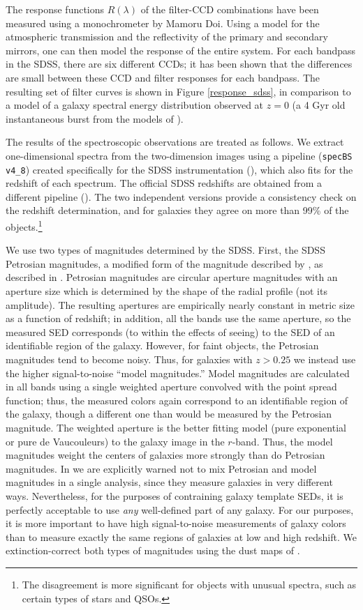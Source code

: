 \documentclass[10pt,preprint]{aastex}
\begin{document}
The response functions $R(\lambda)$ of the filter-CCD combinations
have been measured using a monochrometer by Mamoru Doi.  Using a model
for the atmospheric transmission and the reflectivity of the primary
and secondary mirrors, one can then model the response of the entire
system. For each bandpass in the SDSS, there are six different CCDs;
it has been shown that the differences are small between these CCD and
filter responses for each bandpass.  The resulting set of filter
curves is shown in Figure \ref{response_sdss}, in comparison to a
model of a galaxy spectral energy distribution observed at $z=0$ (a 4
Gyr old instantaneous burst from the models of \citealt{bruzual93a}).

The results of the spectroscopic observations are treated as follows.
We extract one-dimensional spectra from the two-dimension images using
a pipeline ({\tt specBS v4\_8}) created specifically for the SDSS
instrumentation (\citealt{schlegel02a}), which also fits for the
redshift of each spectrum. The official SDSS redshifts are obtained
from a different pipeline (\citealt{subbarao02a}). The two independent
versions provide a consistency check on the redshift determination,
and for galaxies they agree on more than 99\% of the
objects.\footnote{The disagreement is more significant for objects
with unusual spectra, such as certain types of stars and QSOs.}

We use two types of magnitudes determined by the SDSS. First, the SDSS
Petrosian magnitudes, a modified form of the magnitude described by
\citet{petrosian76a}, as described in \citet{strauss02a}.  Petrosian
magnitudes are circular aperture magnitudes with an aperture size
which is determined by the shape of the radial profile (not its
amplitude). The resulting apertures are empirically nearly constant in
metric size as a function of redshift; in addition, all the bands use
the same aperture, so the measured SED corresponds (to within the
effects of seeing) to the SED of an identifiable region of the
galaxy. However, for faint objects, the Petrosian magnitudes tend to
become noisy. Thus, for galaxies with $z>0.25$ we instead use the
higher signal-to-noise ``model magnitudes.'' Model magnitudes are
calculated in all bands using a single weighted aperture convolved
with the point spread function; thus, the measured colors again
correspond to an identifiable region of the galaxy, though a different
one than would be measured by the Petrosian magnitude. The weighted
aperture is the better fitting model (pure exponential or pure de
Vaucouleurs) to the galaxy image in the $r$-band. Thus, the model
magnitudes weight the centers of galaxies more strongly than do
Petrosian magnitudes. In \citet{stoughton02a} we are explicitly warned
not to mix Petrosian and model magnitudes in a single analysis, since
they measure galaxies in very different ways. Nevertheless, for the
purposes of contraining galaxy template SEDs, it is perfectly
acceptable to use {\it any} well-defined part of any galaxy.  For our
purposes, it is more important to have high signal-to-noise
measurements of galaxy colors than to measure exactly the same regions
of galaxies at low and high redshift.  We extinction-correct both
types of magnitudes using the dust maps of \citet{schlegel98a}.
\end{document}
